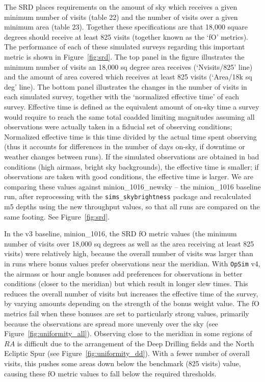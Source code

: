 \documentclass[DM,authoryear,toc]{lsstdoc}
\newcommand{\opsim}{\texttt{OpSim}\xspace}
\newcommand{\simsky}{\texttt{sims\_skybrightness}\xspace}
\begin{document}
The SRD places requirements on the amount of sky which receives a given minimum number of visits (table 22) and the number of visits over a given minimum area (table 23). Together these specifications are that 18,000 square degrees should receive at least 825 visits (together known as the `fO' metrics). The performance of each of these simulated surveys regarding this important metric is shown in Figure~\ref{fig:srd}. The top panel in the figure illustrates the minimum number of visits an 18,000 sq degree area receives (`Nvisits/825' line) and the amount of area covered which receives at least 825 visits (`Area/18k sq deg' line).  The bottom panel illustrates the changes in the number of visits in each simulated survey, together with the `normalized effective time' of each survey. Effective time is defined as the equivalent amount of on-sky time a survey would require to reach the same total coadded limiting magnitudes assuming all observations were actually taken in a fiducial set of observing conditions; Normalized effective time is this time divided by the actual time spent observing (thus it accounts for differences in the number of days on-sky, if downtime or weather changes between runs). If the simulated observations are obtained in bad conditions (high airmass, bright sky backgrounds), the effective time is smaller; if observations are taken with good conditions, the effective time is larger. We are comparing these values against minion\_1016\_newsky -- the minion\_1016 baseline run, after reprocessing with the \simsky package and recalculated m5 depths using the new throughput values, so that all runs are compared on the same footing. See Figure~\ref{fig:srd}. 

In the v3 baseline, minion\_1016, the SRD fO metric values (the minimum number of visits over 18,000 sq degrees as well as the area receiving at least 825 visits) were relatively high, because the overall number of visits was larger than in runs where bonus values prefer observations near the meridian. With \opsim v4, the airmass or hour angle bonuses add preferences for observations in better conditions (closer to the meridian) but which result in longer slew times. This reduces the overall number of visits but increases the effective time of the survey, by varying amounts depending on the strength of the bonus weight value. The fO metrics fail when these bonuses are set to particularly strong values, primarily because the observations are spread more unevenly over the sky (see Figure~\ref{fig:uniformity_all}).  Observing close to the meridian in some regions of $RA$ is difficult due to the arrangement of the Deep Drilling fields and the North Ecliptic Spur (see Figure~\ref{fig:uniformity_dd}). With a fewer number of overall visits, this pushes some areas down below the benchmark (825 visits) value, causing these fO metric values to fall below the required thresholds.
\end{document}
